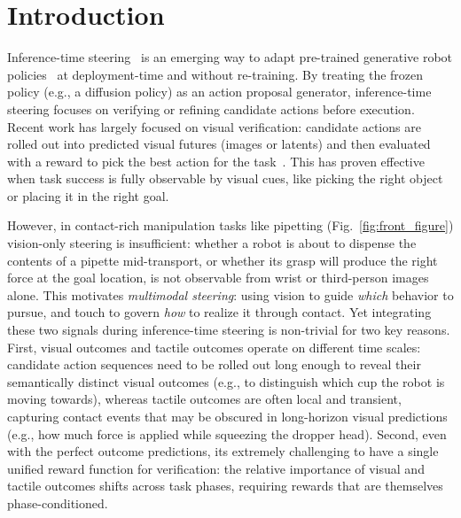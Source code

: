 \section{Introduction}
\label{sec:introduction}

Inference-time steering~\cite{wu2025foresight, du2025dynaguidesteeringdiffusionpolices, sun2026latent, kwok2025robomonkey, wang2024inference, hansteer2026, wagenmaker2025steering, yuan2026actasklearnuncertaintyaware} is an emerging way to adapt pre-trained generative robot policies~\cite{chi2024diffusionpolicy, black2024pi_0} at deployment-time and without re-training. 
By treating the frozen policy (e.g., a diffusion policy) as an action proposal generator, inference-time steering focuses on verifying or refining candidate actions before execution. 
Recent work has largely focused on visual verification: candidate actions are rolled out into predicted visual futures (images or latents) and then evaluated with a reward to pick the best action for the task~\cite{wu2025foresight,du2025dynaguidesteeringdiffusionpolices, sun2026latent,yuan2026actasklearnuncertaintyaware}. 
This has proven effective when task success is fully observable by visual cues, like picking the right object or placing it in the right goal.



However, in contact-rich manipulation tasks like pipetting (Fig.~\ref{fig:front_figure}) vision-only steering is insufficient: whether a robot is about to dispense the contents of a pipette mid-transport, or whether its grasp will produce the right force at the goal location, is not observable from wrist or third-person images alone. 
This motivates \textit{multimodal steering}: using vision to guide \textit{which} behavior to pursue, and touch to govern \textit{how} to realize it through contact. 
Yet integrating these two signals during inference-time steering is non-trivial for two key reasons. 
First, visual outcomes and tactile outcomes operate on different time scales: candidate action sequences need to be rolled out long enough to reveal their semantically distinct visual outcomes (e.g., to distinguish which cup the robot is moving towards), whereas tactile outcomes are often local and transient, capturing contact events 
that may be obscured in long-horizon visual predictions (e.g., how much force is applied while squeezing the dropper head). 
Second, even with the perfect outcome predictions, its extremely challenging to have a single unified reward function for verification:
the relative importance of visual and tactile outcomes shifts across task phases, requiring rewards that are themselves phase-conditioned.




